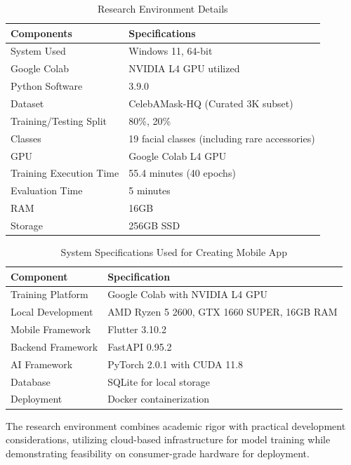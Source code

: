 \documentclass[12pt,a4paper]{report}
\begin{document}
\begin{table}[H]
\centering
\caption{Research Environment Details}
\label{tab:dataset_details}
\begin{tabular}{|l|l|}
\hline
\textbf{Components} & \textbf{Specifications} \\
\hline
System Used & Windows 11, 64-bit \\
\hline
Google Colab & NVIDIA L4 GPU utilized \\
\hline
Python Software & 3.9.0 \\
\hline
Dataset & CelebAMask-HQ (Curated 3K subset) \\
\hline
Training/Testing Split & 80\%, 20\% \\
\hline
Classes & 19 facial classes (including rare accessories) \\
\hline
GPU & Google Colab L4 GPU \\
\hline
Training Execution Time & 55.4 minutes (40 epochs) \\
\hline
Evaluation Time & 5 minutes \\
\hline
RAM & 16GB \\
\hline
Storage & 256GB SSD \\
\hline
\end{tabular}
\end{table}

\begin{table}[H]
\centering
\caption{System Specifications Used for Creating Mobile App}
\label{tab:system_specs}
\begin{tabular}{|l|l|}
\hline
\textbf{Component} & \textbf{Specification} \\
\hline
Training Platform & Google Colab with NVIDIA L4 GPU \\
\hline
Local Development & AMD Ryzen 5 2600, GTX 1660 SUPER, 16GB RAM \\
\hline
Mobile Framework & Flutter 3.10.2 \\
\hline
Backend Framework & FastAPI 0.95.2 \\
\hline
AI Framework & PyTorch 2.0.1 with CUDA 11.8 \\
\hline
Database & SQLite for local storage \\
\hline
Deployment & Docker containerization \\
\hline
\end{tabular}
\end{table}

The research environment combines academic rigor with practical development considerations, utilizing cloud-based infrastructure for model training while demonstrating feasibility on consumer-grade hardware for deployment.
\end{document}
